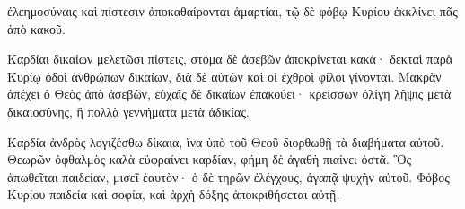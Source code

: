 {ἐλεημοσύναις καὶ πίστεσιν ἀποκαθαίρονται ἁμαρτίαι, τῷ δὲ φόβῳ Κυρίου ἐκκλίνει πᾶς ἀπὸ κακοῦ.
\par }{\PP {}Καρδίαι δικαίων μελετῶσι πίστεις, στόμα δὲ ἀσεβῶν ἀποκρίνεται κακά·
δεκταὶ παρὰ Κυρίῳ ὁδοὶ ἀνθρώπων δικαίων, διὰ δὲ αὐτῶν καὶ οἱ ἐχθροὶ φίλοι γίνονται.
Μακρὰν ἀπέχει ὁ Θεὸς ἀπὸ ἀσεβῶν, εὐχαῖς δὲ δικαίων ἐπακούει·
κρείσσων ὀλίγη λῆψις μετὰ δικαιοσύνης, ἢ πολλὰ γεννήματα μετὰ ἀδικίας.
\par }{\PP {}Καρδία ἀνδρὸς λογιζέσθω δίκαια, ἵνα ὑπὸ τοῦ Θεοῦ διορθωθῇ τὰ διαβήματα αὐτοῦ.
Θεωρῶν ὀφθαλμὸς καλὰ εὐφραίνει καρδίαν, φήμη δὲ ἀγαθὴ πιαίνει ὀστᾶ.
Ὃς ἀπωθεῖται παιδείαν, μισεῖ ἑαυτὸν· ὁ δὲ τηρῶν ἐλέγχους, ἀγαπᾷ ψυχὴν αὐτοῦ.
Φόβος Κυρίου παιδεία καὶ σοφία, καὶ ἀρχὴ δόξης ἀποκριθήσεται αὐτῇ.

}
